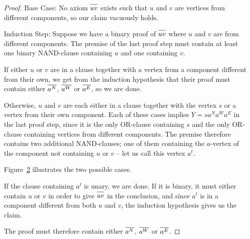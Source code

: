 \begin{proof}
  Base Case:
  No axiom $\ol{uv}$ exists such that $u$ and $v$ are vertices from different components, so our claim vacuously holds.

  Induction Step:
  Suppose we have a binary proof of $\ol{uv}$ where $u$ and $v$ are from different components.
  The premise of the last proof step must contain at least one binary NAND-clause containing $u$ and one containing $v$.\par
  \begin{figure}[!h]
    \centering
    \begin{prooftree*}
      \Hypo{\dots}
    \end{prooftree*}
    \caption{}
    \label{fig:proof_scheme_uv}
  \end{figure}
  If either $u$ or $v$ are in a clause together with a vertex from a component different from their own, we get from the induction hypothesis that their proof must contain either $\ol{a^N}$, $\ol{a^W}$ or $\ol{a^E}$, so we are done.

  Otherwise, $u$ and $v$ are each either in a clause together with the vertex $s$ or a vertex from their own component.
  Each of these cases implies $Y = sa^Na^Wa^E$ in the last proof step, since it is the only OR-clause containing $s$ and the only OR-clause containing vertices from different components.
  The premise therefore contains two additional NAND-clauses; one of them containing the $a$-vertex of the component not containing $u$ or $v$ -- let us call this vertex $a^t$.

  Figure~\ref{fig:proof_example_uv} illustrates the two possible cases.\par
  \begin{figure}[!h]
    \centering
    \begin{prooftree}
    \end{prooftree}
    \hspace{5mm}
    \begin{prooftree}
    \end{prooftree}
    \caption{}
    \label{fig:proof_example_uv}
  \end{figure}
  If the clause containing $a^t$ is unary, we are done.
  If it is binary, it must either contain $u$ or $v$ in order to give $\ol{uv}$ in the conclusion, and since $a^t$ is in a component different from both $u$ and $v$, the induction hypothesis gives us the claim.

  The proof must therefore contain either $\ol{a^N}$, $\ol{a^W}$ or $\ol{a^E}$.
\end{proof}
